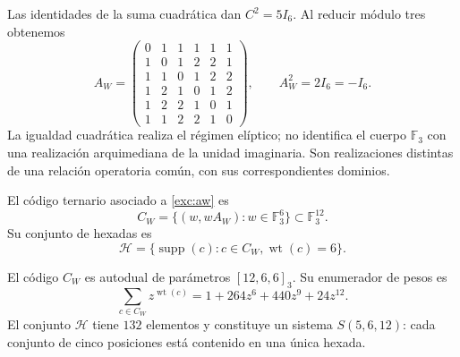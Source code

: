 Las identidades de la suma cuadrática dan $C^2=5I_6$. Al reducir módulo
tres obtenemos
\begin{equation}
 A_W=
 \begin{pmatrix}
 0&1&1&1&1&1\\
 1&0&1&2&2&1\\
 1&1&0&1&2&2\\
 1&2&1&0&1&2\\
 1&2&2&1&0&1\\
 1&1&2&2&1&0
 \end{pmatrix},
 \qquad A_W^2=2I_6=-I_6.
 \label{exc:aw}
\end{equation}
La igualdad cuadrática realiza el régimen elíptico; no identifica el
cuerpo $\mathbb F_3$ con una realización arquimediana de la unidad
imaginaria. Son realizaciones distintas de una relación operatoria
común, con sus correspondientes dominios.

\begin{definition}
\label{exc:codigo}
El código ternario asociado a \eqref{exc:aw} es
\[
 C_W=\{(w,wA_W):w\in\mathbb F_3^6\}
       \subset\mathbb F_3^{12}.
\]
Su conjunto de hexadas es
\[
 \mathcal H=
 \{\operatorname{supp}(c):c\in C_W,
                           \operatorname{wt}(c)=6\}.
\]
\end{definition}

\begin{proposition}
\label{exc:codigo-witt}
El código $C_W$ es autodual de parámetros $[12,6,6]_3$. Su enumerador
de pesos es
\begin{equation}
 \sum_{c\in C_W}z^{\operatorname{wt}(c)}
   =1+264z^6+440z^9+24z^{12}.
 \label{exc:enumerador}
\end{equation}
El conjunto $\mathcal H$ tiene $132$ elementos y constituye un sistema
$S(5,6,12)$: cada conjunto de cinco posiciones está contenido en una
única hexada.
\end{proposition}

